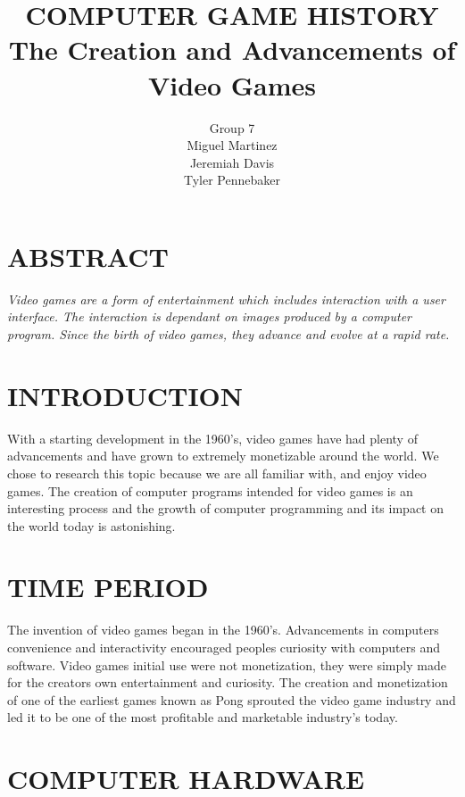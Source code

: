 \documentclass[letterpaper, 10 pt, conference]{IEEEconf}
\title{\LARGE \bf
COMPUTER GAME HISTORY\\
\large The Creation and Advancements of Video Games
}
\author{Group 7\\
\small Miguel Martinez\\
\small Jeremiah Davis\\
\small Tyler Pennebaker\\
}
\begin{document}
\maketitle
\thispagestyle{empty}
\pagestyle{empty}


\section*{ABSTRACT}
\textit{
Video games are a form of entertainment which includes interaction with a user interface. The interaction is dependant on images produced by a computer program. Since the birth of video games, they advance and evolve at a rapid rate.
}

\section{INTRODUCTION}

With a starting development in the 1960's, video games have had plenty of advancements and have grown to extremely monetizable around the world. We chose to research this topic because we are all familiar with, and enjoy video games. The creation of computer programs intended for video games is an interesting process and the growth of computer programming and its impact on the world today is astonishing.

\section{TIME PERIOD}

The invention of video games began in the 1960's. Advancements in computers convenience and interactivity encouraged peoples curiosity with computers and software. Video games initial use were not monetization, they were simply made for the creators own entertainment and curiosity. The creation and monetization of one of the earliest games known as Pong sprouted the video game industry and led it to be one of the most profitable and marketable industry's today.

\section{COMPUTER HARDWARE}
\end{document}
